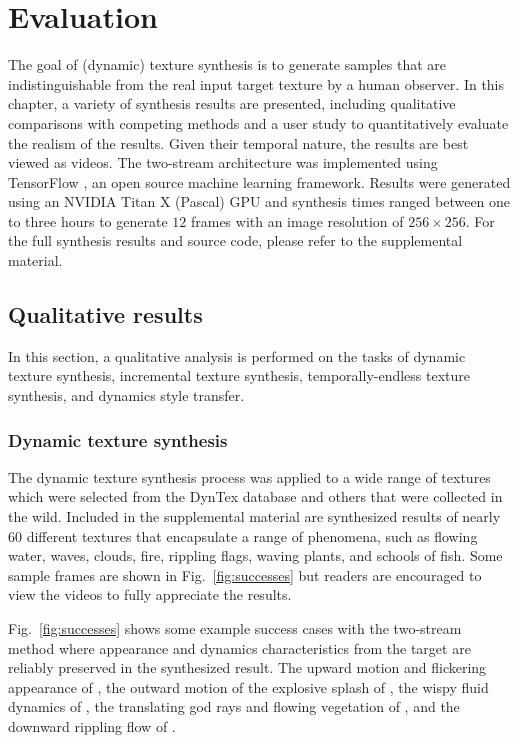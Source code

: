 \chapter{Evaluation }\label{chap:evaluation}

The goal of (dynamic) texture synthesis is to generate 
samples that are indistinguishable from the real input target
texture by a human observer.
In this chapter, a variety of synthesis results are presented,
including qualitative comparisons with competing methods and a user study to quantitatively evaluate the realism
of the results.
Given their temporal nature, the results are best viewed as 
videos.
The two-stream architecture was implemented using TensorFlow
\cite{tabadi2015tensorflowlong}, an open source machine learning framework.
Results were generated using an NVIDIA Titan X (Pascal) GPU
and synthesis times ranged between one to three hours 
to generate $12$ frames with an image resolution of 
$256 \times 256$.
For the full synthesis results and source code, please refer to the
supplemental material. 

\section{Qualitative results}\label{sec:qualitative_results}

In this section, a qualitative analysis is performed on the tasks of dynamic texture synthesis, incremental texture synthesis,
temporally-endless texture synthesis, and dynamics style transfer.

\subsection{Dynamic texture synthesis}

The dynamic texture synthesis process was applied 
to a wide range of textures which were selected from the 
DynTex \cite{peteri2010} database and others that were collected in
the wild.
Included in the supplemental material are synthesized results
of nearly 60 different textures that encapsulate a range of
phenomena, such as flowing water, waves, clouds, fire, rippling
flags, waving plants, and schools of fish.
Some sample frames are shown in Fig.\ \ref{fig:successes}
but readers are encouraged to view the videos to fully appreciate
the results.

Fig.\ \ref{fig:successes} shows some example success cases with the
two-stream method where appearance and dynamics characteristics from the
target are reliably preserved in the synthesized result. The
upward motion and flickering appearance of , the outward
motion of the explosive splash of ,
the wispy fluid dynamics of , the translating god rays and
flowing vegetation of , and the downward 
rippling flow of .


